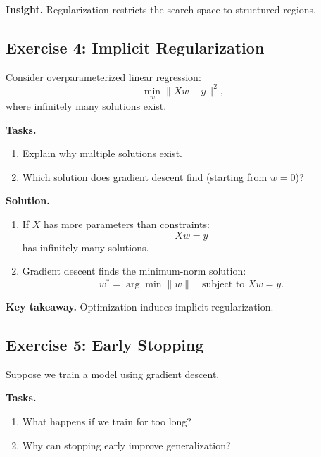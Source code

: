 \medskip

\noindent
\textbf{Insight.}  
Regularization restricts the search space to structured regions.

\subsection{Exercise 4: Implicit Regularization}

Consider overparameterized linear regression:
\[
\min_w \|Xw - y\|^2,
\]
where infinitely many solutions exist.

\medskip

\noindent
\textbf{Tasks.}
\begin{enumerate}
    \item Explain why multiple solutions exist.
    \item Which solution does gradient descent find (starting from $w=0$)?
\end{enumerate}

\medskip

\noindent
\textbf{Solution.}

\begin{enumerate}
\item If $X$ has more parameters than constraints:
\[
Xw = y
\]
has infinitely many solutions.

\item Gradient descent finds the minimum-norm solution:
\[
w^* = \arg\min \|w\| \quad \text{subject to } Xw = y.
\]
\end{enumerate}

\medskip

\noindent
\textbf{Key takeaway.}  
Optimization induces implicit regularization.

\subsection{Exercise 5: Early Stopping}

Suppose we train a model using gradient descent.

\medskip

\noindent
\textbf{Tasks.}
\begin{enumerate}
    \item What happens if we train for too long?
    \item Why can stopping early improve generalization?
\end{enumerate}

\medskip

